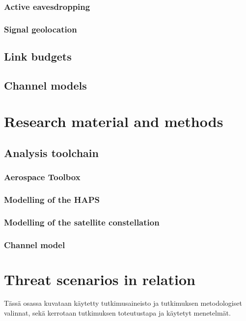 \documentclass[english, 12pt, a4paper, elec, utf8, a-1b, online]{aaltothesis}
\begin{document}
\subsubsection{Active eavesdropping}

\subsubsection{Signal geolocation}

\subsection{Link budgets}
\subsection{Channel models}

\clearpage

\section{Research material and methods}

\subsection{Analysis toolchain}
\subsubsection{Aerospace Toolbox}
\subsubsection{Modelling of the HAPS}
\subsubsection{Modelling of the satellite constellation}
\subsubsection{Channel model}

\section{Threat scenarios in relation}
T\"ass\"a osassa kuvataan k\"aytetty tutkimusaineisto ja
tutkimuksen metodologiset valinnat, sek\"a
kerrotaan tutkimuksen toteutustapa ja k\"aytetyt menetelm\"at.
\end{document}
